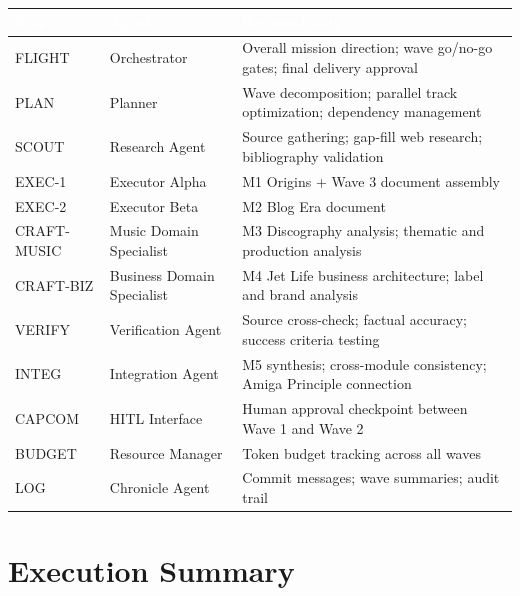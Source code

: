 \documentclass[11pt,letterpaper]{article}
\newcommand{\tableheader}[1]{\textbf{\sffamily\textcolor{white}{#1}}}
\begin{document}
\begin{center}
\begin{tabularx}{\textwidth}{L{2cm}L{3cm}X}
\toprule
{}
\tableheader{Role} & \tableheader{Agent} & \tableheader{Responsibility} \\
\midrule
FLIGHT & Orchestrator & Overall mission direction; wave go/no-go gates; final delivery approval \\
PLAN & Planner & Wave decomposition; parallel track optimization; dependency management \\
SCOUT & Research Agent & Source gathering; gap-fill web research; bibliography validation \\
EXEC-1 & Executor Alpha & M1 Origins + Wave 3 document assembly \\
EXEC-2 & Executor Beta & M2 Blog Era document \\
CRAFT-MUSIC & Music Domain Specialist & M3 Discography analysis; thematic and production analysis \\
CRAFT-BIZ & Business Domain Specialist & M4 Jet Life business architecture; label and brand analysis \\
VERIFY & Verification Agent & Source cross-check; factual accuracy; success criteria testing \\
INTEG & Integration Agent & M5 synthesis; cross-module consistency; Amiga Principle connection \\
CAPCOM & HITL Interface & Human approval checkpoint between Wave 1 and Wave 2 \\
BUDGET & Resource Manager & Token budget tracking across all waves \\
LOG & Chronicle Agent & Commit messages; wave summaries; audit trail \\
\bottomrule
\end{tabularx}
\end{center}

\section{Execution Summary}
\end{document}

